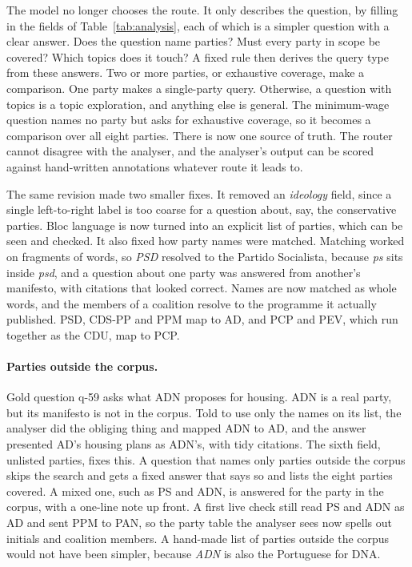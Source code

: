 The model no longer chooses the route. It only describes the question, by
filling in the fields of Table~\ref{tab:analysis}, each of which is a simpler
question with a clear answer. Does the question name parties? Must every party
in scope be covered? Which topics does it touch? A fixed rule then derives the
query type from these answers. Two or more parties, or
exhaustive coverage, make a comparison. One party makes a single-party query.
Otherwise, a question with topics is a topic exploration, and anything else is
general. The minimum-wage question names no party but asks for exhaustive
coverage, so it becomes a comparison over all eight parties. There is now one
source of truth. The router cannot disagree with the analyser, and the
analyser's output can be scored against hand-written annotations whatever
route it leads to.

The same revision made two smaller fixes. It removed an \emph{ideology} field,
since a single left-to-right label is too coarse for a question about, say,
the conservative parties. Bloc language is now turned into an explicit list of
parties, which can be seen and checked. It also fixed how party names were
matched. Matching worked on fragments of words, so \textit{PSD} resolved to
the Partido Socialista, because \textit{ps} sits inside \textit{psd}, and a
question about one party was answered from another's manifesto, with citations
that looked correct. Names are now matched as whole words, and the members of
a coalition resolve to the programme it actually published. PSD, CDS-PP and
PPM map to AD, and PCP and PEV, which run together as the CDU, map to PCP.

\paragraph{Parties outside the corpus.} Gold question q-59 asks what ADN
proposes for housing. ADN is a real party, but its manifesto is not in the
corpus. Told to use only the names on its list, the analyser did the obliging
thing and mapped ADN to AD, and the answer presented AD's housing plans as
ADN's, with tidy citations. The sixth field, unlisted parties, fixes this. A
question that names only parties outside the corpus skips the search and gets
a fixed answer that says so and lists the eight parties covered. A mixed one,
such as PS and ADN, is answered for the party in the corpus, with a
one-line note up front. A first live check still read PS and ADN as AD
and sent PPM to PAN, so the party table the analyser sees now spells out
initials and coalition members. A hand-made list of parties outside the corpus
would not have been simpler, because \textit{ADN} is also the Portuguese for
DNA.


